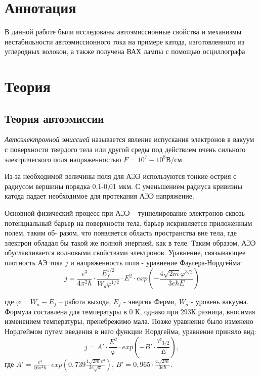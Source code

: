 \documentclass[a4paper,12pt]{article}
\theoremstyle{plain} %
\theoremstyle{definition} %
\theoremstyle{remark} %
\begin{document}
\section{Аннотация} 
В данной работе были исследованы автоэмиссионные свойства и механизмы нестабильности автоэмиссионного тока на примере катода, изготовленного из углеродных волокон, а также получена ВАХ лампы с помощью осциллографа 

\section{Теория}
	
\subsection*{Теория автоэмиссии}
\textit{Автоэлектронной эмиссией} называется явление испускания электронов в вакуум с поверхности твердого тела или другой среды под действием очень сильного электрического поля напряженностью $F = 10^{7}-10^{8}$В/см.

Из-за необходимой величины поля для АЭЭ используются тонкие острия с радиусом вершины порядка 0,1-0,01 мкм. С уменьшением радиуса кривизны катода падает необходимое для протекания АЭЭ напряжение.

Основной физический процесс при АЭЭ – туннелирование электронов сквозь потенциальный барьер на поверхности тела, барьер искривляется приложенным полем, таким об- разом, что появляется область пространства вне тела, где электрон обладал бы такой же полной энергией, как в теле. Таким образом, АЭЭ обуславливается волновыми свойствами электронов.
Уравнение, связывающее плотность АЭ тока $j$ и напряженность поля - уравнение Фаулера-Нордгейма:
\begin{equation*}
    j = \frac{e^3}{4\pi^2\hbar}\cdot \frac{E^{1/2}_{f}}{W_{a}\varphi^{1/2}}\cdot E^{2}\cdot exp(-\frac{4\sqrt{2m}\varphi^{3/2}}{3e\hbar E})
\end{equation*}
    
где $\varphi = W_{a}-E_{f}$ – работа выхода, $E_{f}$ - энергия Ферми, $W_{a}$ - уровень вакуума.
Формула составлена для температуры в 0 К, однако при 293К разница, вносимая изменением температуры, пренебрежимо мала. Позже уравнение было изменено Нордгеймом путем введения в него функции Нордгейма, уравнение приняло вид:
\begin{equation*}
    j = A' \cdot \frac{E^{2}}{\varphi}\cdot exp(-B'\cdot \frac{\varphi_{3/2}}{E}),
\end{equation*}
где $A' = \frac{e^3}{16\pi^2\hbar}\cdot exp(0,739 \frac{4\sqrt{2m}e^3}{3e\sqrt{\varphi}})$, $B' = 0,965\cdot \frac{4\sqrt{2m}}{3e\hbar}$.
\end{document}
